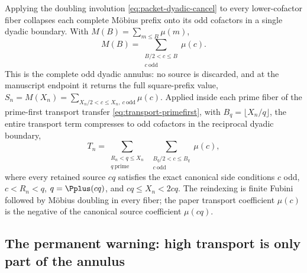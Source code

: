 Applying the doubling involution \cref{eq:packet-dyadic-cancel} to every lower-cofactor fiber collapses each complete Möbius prefix onto its odd cofactors in a single dyadic boundary.  With $M(B)=\sum_{m\le B}\mu(m)$,
\begin{equation}
 \boxed{
 M(B)=\!\!\sum_{\substack{B/2<c\le B\\ c\ \mathrm{odd}}}\!\!\mu(c).
 }
 \label{eq:odd-annulus-identity}
\end{equation}
This is the complete odd dyadic annulus: no source is discarded, and at the manuscript endpoint it returns the full square-prefix value, $S_n=M(X_n)=\sum_{X_n/2<c\le X_n,\ c\ \mathrm{odd}}\mu(c)$.  Applied inside each prime fiber of the prime-first transport transfer \cref{eq:transport-primefirst}, with $B_q=\lfloor X_n/q\rfloor$, the entire transport term compresses to odd cofactors in the reciprocal dyadic boundary,
\begin{equation}
 \boxed{
 T_n=\!\!\sum_{\substack{R_n<q\le X_n\\ q\ \mathrm{prime}}}\
 \sum_{\substack{B_q/2<c\le B_q\\ c\ \mathrm{odd}}}\!\!\mu(c),
 }
 \label{eq:transport-dyadic}
\end{equation}
where every retained source $cq$ satisfies the exact canonical side conditions $c$ odd, $c<R_n<q$, $q=\Pplus(cq)$, and $cq\le X_n<2cq$.  The reindexing is finite Fubini followed by M\"obius doubling in every fiber; the paper transport coefficient $\mu(c)$ is the negative of the canonical source coefficient $\mu(cq)$.

\subsection{The permanent warning: high transport is only part of the annulus}

